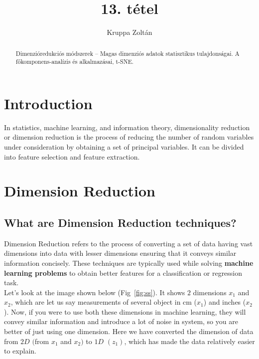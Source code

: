 \documentclass[12pt]{article}
\theoremstyle{plain}
\begin{document}
\title{13. tétel}
\author{Kruppa Zoltán}

\maketitle


\newpage
\begin{abstract}
    Dimenzióredukciós módszerek – Magas dimenziós adatok statisztikus tulajdonságai. A főkomponens-analízis és alkalmazásai, t-SNE.
\end{abstract}

\tableofcontents

\section{Introduction}

In statistics, machine learning, and information theory, dimensionality reduction or dimension reduction is the process of reducing the number of random variables under consideration by obtaining a set of principal variables. It can be divided into feature selection and feature extraction.\cite{wiki_dim}

\section{Dimension Reduction\cite{dim_red}}
\subsection{What are Dimension Reduction techniques?}

Dimension Reduction refers to the process of converting a set of data having vast dimensions into data with lesser dimensions ensuring that it conveys similar information concisely. These techniques are typically used while solving \textbf{machine learning problems} to obtain better features for a classification or regression task.
\\

Let’s look at the image shown below (Fig~\ref{fig:ss}). It shows $2$ dimensions $x_1$ and $x_2$, which are let us say measurements of several object in cm ($x_1$) and inches ($x_2$). Now, if you were to use both these dimensions in machine learning, they will convey similar information and introduce a lot of noise in system, so you are better of just using one dimension. Here we have converted the dimension of data from $2D$ $($from $x_1$ and $x_2)$ to $1D$ $(z_1)$, which has made the data relatively easier to explain.
\\
\end{document}
